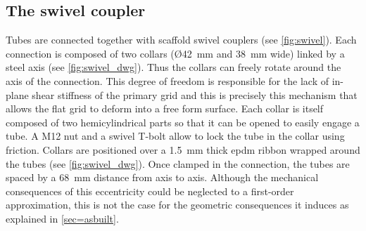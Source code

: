\subsection{The swivel coupler}\label{sec=swivel}
Tubes are connected together with scaffold swivel couplers (see \cref{fig:swivel}). Each connection is composed of two collars (\O\;\SI{42}{\mm} and \SI{38}{\mm} wide) linked by a steel axis (see \cref{fig:swivel_dwg}). Thus the collars can freely rotate around the axis of the connection. This degree of freedom is responsible for the lack of in-plane shear stiffness of the primary grid and this is precisely this mechanism that allows the flat grid to deform into a free form surface. Each collar is itself composed of two hemicylindrical parts so that it can be opened to easily engage a tube. A M12 nut and a swivel T-bolt allow to lock the tube in the collar using friction. Collars are positioned over a \SI{1.5}{\mm} thick epdm ribbon wrapped around the tubes (see \cref{fig:swivel_dwg}). Once clamped in the connection, the tubes are spaced by a \SI{68}{\mm} distance from axis to axis. Although the mechanical consequences of this eccentricity could be neglected to a first-order approximation, this is not the case for the geometric consequences it induces as explained in \cref{sec=asbuilt}.



